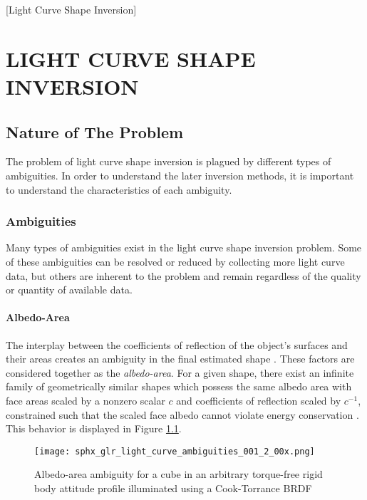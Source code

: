 [Light Curve Shape Inversion]
\graphicspath{{/Users/liamrobinson/Documents/PyLightCurves/docs/build/html/_images}}
\chapter{LIGHT CURVE SHAPE INVERSION}

\section{Nature of The Problem}

The problem of light curve shape inversion is plagued by different types of ambiguities. In order to understand the later inversion methods, it is important to understand the characteristics of each ambiguity.

\subsection{Ambiguities}

Many types of ambiguities exist in the light curve shape inversion problem. Some of these ambiguities can be resolved or reduced by collecting more light curve data, but others are inherent to the problem and remain regardless of the quality or quantity of available data.

\subsubsection{Albedo-Area}

The interplay between the coefficients of reflection of the object's surfaces and their areas creates an ambiguity in the final estimated shape \cite{fan2020thesis}. These factors are considered together as the \textit{albedo-area}. For a given shape, there exist an infinite family of geometrically similar shapes which possess the same albedo area with face areas scaled by a nonzero scalar $c$ and coefficients of reflection scaled by $c^{-1}$, constrained such that the scaled face albedo cannot violate energy conservation \cite{fan2020thesis}. This behavior is displayed in Figure \ref{fig:albedo_amb}.

\begin{figure}[!htb]
  \centering
  \texttt{[image: sphx\_glr\_light\_curve\_ambiguities\_001\_2\_00x.png]}
  \caption{Albedo-area ambiguity for a cube in an arbitrary torque-free rigid body attitude profile illuminated using a Cook-Torrance BRDF}
  \label{fig:albedo_amb}
\end{figure}

